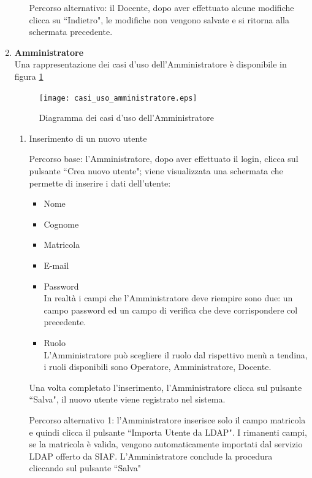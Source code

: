 \begin{enumerate}
\begin{enumerate}
 Percorso alternativo:
 il Docente, dopo aver effettuato alcune modifiche clicca su ``Indietro", le modifiche non vengono salvate e si ritorna alla schermata precedente.

 
\end{enumerate}



\item \textbf{Amministratore}\\
Una rappresentazione dei casi d'uso dell'Amministratore è disponibile in figura \ref{use_case_diag_admin}
\begin{figure}[h]
  \caption{Diagramma dei casi d'uso dell'Amministratore}
  \label{use_case_diag_admin}
  \centering
    \texttt{[image: casi\_uso\_amministratore.eps]}
\end{figure}


\begin{enumerate}
 \item Inserimento di un nuovo utente\\ \label{UC_new_user}
 
 
 Percorso base:
 l'Amministratore, dopo aver effettuato il login, clicca sul pulsante ``Crea nuovo utente"; viene visualizzata una schermata che permette
 di inserire i dati dell'utente:
 \begin{itemize}
  \item Nome
  \item Cognome
  \item Matricola
  \item E-mail
  \item	Password\\
    In realtà i campi che l'Amministratore deve riempire sono due: un campo password ed un campo di verifica che deve corrispondere col precedente.
  \item Ruolo\\
    L'Amministratore può scegliere il ruolo dal rispettivo menù a tendina, i ruoli disponibili sono Operatore, Amministratore, Docente.
 \end{itemize}
 
 Una volta completato l'inserimento, l'Amministratore clicca sul pulsante ``Salva", il nuovo utente viene registrato nel sistema. 

 Percorso alternativo 1:
 l'Amministratore inserisce solo il campo matricola e quindi clicca il pulsante ``Importa Utente da LDAP". I rimanenti campi, se la matricola è valida,
 vengono automaticamente importati dal servizio LDAP offerto da SIAF. L'Amministratore conclude la procedura cliccando sul pulsante ``Salva"
 

\end{enumerate}
\end{enumerate}
